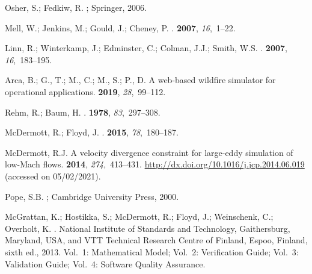 \documentclass[atmosphere,article,accept,moreauthors,pdftex]{Definitions/mdpi}
\begin{document}
\begin{thebibliography}{999}
Osher, S.; Fedkiw, R.
; Springer,
  2006.

Mell, W.; Jenkins, M.; Gould, J.; Cheney, P.
.
 {\bf 2007}, {\em
  16},~1--22.

Linn, R.; Winterkamp, J.; Edminster, C.; Colman, J.J.; Smith, W.S.
.
 {\bf 2007}, {\em 16},~183--195.

Arca, B.; G., T.; M., C.; M., S.; P., D.
\newblock A web-based wildfire simulator for operational applications.
 {\bf 2019}, {\em
  28},~99--112.

Rehm, R.; Baum, H.
.
 {\bf 1978}, {\em 83},~297--308.

McDermott, R.; Floyd, J.
.
 {\bf 2015}, {\em 78},~180--187.

McDermott, R.J.
\newblock A velocity divergence constraint for large-eddy simulation of
  low-Mach flows.
 {\bf 2014}, {\em
  274},~413--431.
\newblock
  \href{http://dx.doi.org/10.1016/j.jcp.2014.06.019}{http://dx.doi.org/10.1016/j.jcp.2014.06.019} (accessed on 05/02/2021).

Pope, S.B.
; Cambridge University Press,  2000.

McGrattan, K.; Hostikka, S.; McDermott, R.; Floyd, J.; Weinschenk, C.;
  Overholt, K.
.
\newblock National Institute of Standards and Technology, Gaithersburg,
  Maryland, USA, and VTT Technical Research Centre of Finland, Espoo, Finland,
  sixth ed.,  2013.
\newblock Vol.~1: Mathematical Model; Vol.~2: Verification Guide; Vol.~3:
  Validation Guide; Vol.~4: Software Quality Assurance.


\end{thebibliography}
\end{document}
